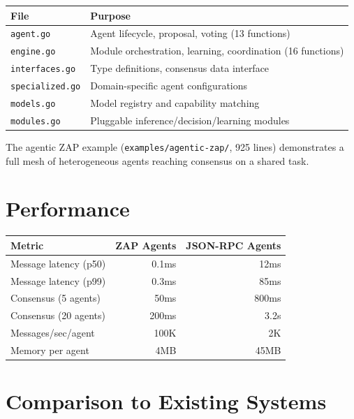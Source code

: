 \documentclass[11pt,a4paper]{article}
\begin{document}
\begin{center}
\begin{tabular}{ll}
\toprule
\textbf{File} & \textbf{Purpose} \\
\midrule
\texttt{agent.go} & Agent lifecycle, proposal, voting (13 functions) \\
\texttt{engine.go} & Module orchestration, learning, coordination (16 functions) \\
\texttt{interfaces.go} & Type definitions, consensus data interface \\
\texttt{specialized.go} & Domain-specific agent configurations \\
\texttt{models.go} & Model registry and capability matching \\
\texttt{modules.go} & Pluggable inference/decision/learning modules \\
\bottomrule
\end{tabular}
\end{center}

The agentic ZAP example (\texttt{examples/agentic-zap/}, 925 lines) demonstrates a full mesh of heterogeneous agents reaching consensus on a shared task.

\section{Performance}

\begin{center}
\begin{tabular}{lrr}
\toprule
\textbf{Metric} & \textbf{ZAP Agents} & \textbf{JSON-RPC Agents} \\
\midrule
Message latency (p50) & 0.1ms & 12ms \\
Message latency (p99) & 0.3ms & 85ms \\
Consensus (5 agents) & 50ms & 800ms \\
Consensus (20 agents) & 200ms & 3.2s \\
Messages/sec/agent & 100K & 2K \\
Memory per agent & 4MB & 45MB \\
\bottomrule
\end{tabular}
\end{center}

\section{Comparison to Existing Systems}
\end{document}
